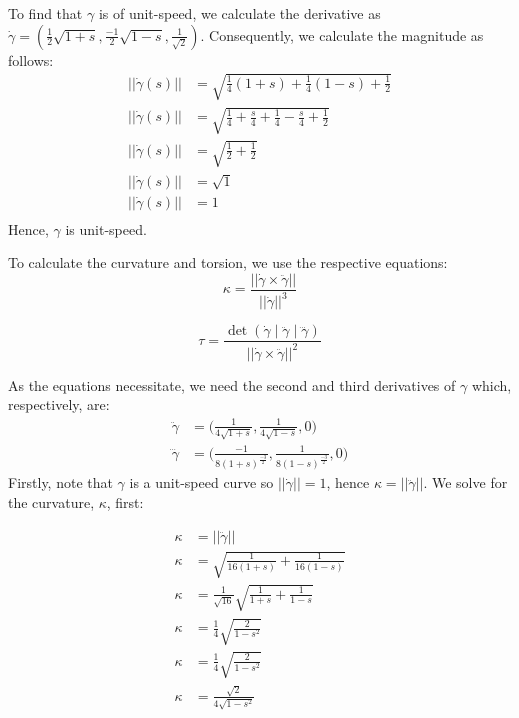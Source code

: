 \documentclass{article}
\begin{document}
    \begin{flushleft}
        To find that $\gamma$ is of unit-speed, we calculate the derivative as $\dot{\gamma} = (\frac{1}{2}\sqrt{1 + s}, \frac{-1}{2}\sqrt{1-s}, \frac{1}{\sqrt{2}})$. Consequently, we calculate the magnitude as follows: 
        \begin{align*}
            ||\dot{\gamma}(s)|| &= \sqrt{\frac{1}{4}(1+s) + \frac{1}{4}(1-s) + \frac{1}{2}} \\ 
            ||\dot{\gamma}(s)|| &= \sqrt{\frac{1}{4} + \frac{s}{4} + \frac{1}{4} - \frac{s}{4} + \frac{1}{2}} \\ 
            ||\dot{\gamma}(s)|| &= \sqrt{\frac{1}{2} + \frac{1}{2}} \\ 
            ||\dot{\gamma}(s)|| &= \sqrt{1} \\ 
            ||\dot{\gamma}(s)|| &= 1 \\ 
        \end{align*}
        Hence, $\gamma$ is unit-speed. \newline

        To calculate the curvature and torsion, we use the respective equations:
        \begin{equation*}
            \kappa = \frac{||\dot{\gamma} \times \ddot{\gamma}||}{||\dot{\gamma}||^3}
        \end{equation*}
        
        \begin{equation*}
                \tau = \frac{\det({\dot{\gamma}} \mid \ddot{\gamma} \mid \dddot{\gamma})}{||\dot{\gamma} \times \ddot{\gamma}||^2}
        \end{equation*}

        As the equations necessitate, we need the second and third derivatives of $\gamma$ which, respectively, are:
        \begin{align*}
            \ddot{\gamma} &= \biggl(\frac{1}{4\sqrt{1+s}}, \frac{1}{4\sqrt{1-s}}, 0\biggl) \\ 
            \dddot{\gamma} &= \biggl(\frac{-1}{8(1+s)^{\frac{-3}{2}}}, \frac{1}{8(1-s)^{\frac{-3}{2}}}, 0\biggl)
        \end{align*}
        Firstly, note that $\gamma$ is a unit-speed curve so $||\dot{\gamma}|| = 1$, hence $\kappa = ||\ddot{\gamma}||$. We solve for the curvature, $\kappa$, first: 

        \begin{align*}
		\kappa &= ||\ddot{\gamma}|| \\ 
		\kappa &= \sqrt{\frac{1}{16(1+s)} + \frac{1}{16(1-s)}} \\ 
		\kappa &= \frac{1}{\sqrt{16}}\sqrt{\frac{1}{1+s} + \frac{1}{1-s}} \\ 
		\kappa &= \frac{1}{4}\sqrt{\frac{2}{1-s^2}} \\ 
		\kappa &= \frac{1}{4}\sqrt{\frac{2}{1-s^2}} \\
		\kappa &= \frac{\sqrt{2}}{4\sqrt{1-s^2}}
        \end{align*}


\end{flushleft}
\end{document}
